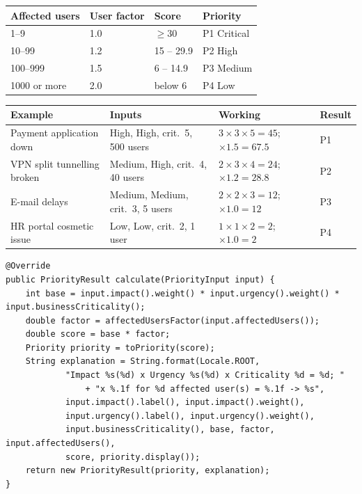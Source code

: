 \begin{tabularx}{\linewidth}{@{}YYYY@{}}
\toprule
\textbf{Affected users} & \textbf{User factor} & \textbf{Score} & \textbf{Priority} \\
--9 & 1.0 & $\geq 30$ & P1 Critical \\
10--99 & 1.2 & 15 -- 29.9 & P2 High \\
100--999 & 1.5 & 6 -- 14.9 & P3 Medium \\
1000 or more & 2.0 & below 6 & P4 Low \\
\bottomrule
\end{tabularx}

\begin{tabularx}{\linewidth}{@{}L{3.6cm}L{2.6cm}Y L{1.2cm}@{}}
\toprule
\textbf{Example} & \textbf{Inputs} & \textbf{Working} & \textbf{Result} \\
\midrule
Payment application down & High, High, crit.\ 5, 500 users & $3 \times 3 \times 5 = 45$; $\times 1.5 = 67.5$ & P1 \\
VPN split tunnelling broken & Medium, High, crit.\ 4, 40 users & $2 \times 3 \times 4 = 24$; $\times 1.2 = 28.8$ & P2 \\
E-mail delays & Medium, Medium, crit.\ 3, 5 users & $2 \times 2 \times 3 = 12$; $\times 1.0 = 12$ & P3 \\
HR portal cosmetic issue & Low, Low, crit.\ 2, 1 user & $1 \times 1 \times 2 = 2$; $\times 1.0 = 2$ & P4 \\
\bottomrule
\end{tabularx}

\begin{lstlisting}[caption={WeightedScoringPriorityStrategy.calculate}]
@Override
public PriorityResult calculate(PriorityInput input) {
    int base = input.impact().weight() * input.urgency().weight() * input.businessCriticality();
    double factor = affectedUsersFactor(input.affectedUsers());
    double score = base * factor;
    Priority priority = toPriority(score);
    String explanation = String.format(Locale.ROOT,
            "Impact %s(%d) x Urgency %s(%d) x Criticality %d = %d; "
                + "x %.1f for %d affected user(s) = %.1f -> %s",
            input.impact().label(), input.impact().weight(),
            input.urgency().label(), input.urgency().weight(),
            input.businessCriticality(), base, factor, input.affectedUsers(),
            score, priority.display());
    return new PriorityResult(priority, explanation);
}
\end{lstlisting}


